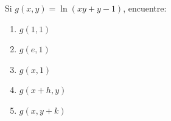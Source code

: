 \item Si $g(x, y) = \ln(xy + y - 1)$, encuentre:
\begin{enumerate}
    \item $g(1, 1)$
    \item $g(e, 1)$
    \item $g(x, 1)$
    \item $g(x + h, y)$
    \item $g(x, y + k)$
\end{enumerate}
